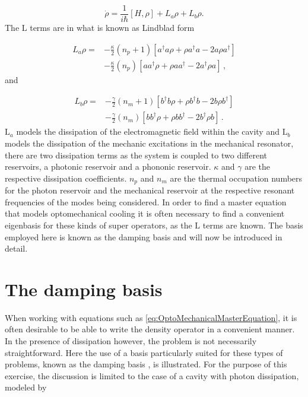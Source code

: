 \documentclass[12pt]{article}
\begin{document}
\begin{equation} \label{eq:OptoMechanicalMasterEquation}
\dot{\rho} = \frac{1}{i\hbar}[H,\rho] +L_a\rho + L_b \rho.
\end{equation} The $\mathrm{L}$ terms are in what is known as Lindblad form 

\begin{align}
L_a \rho =& - \frac{\kappa}{2}(n_p + 1)[a^\dagger a\rho + \rho a^\dagger a -2a\rho a^\dagger]  \\
 &- \frac{\kappa}{2}(n_p)[ aa^\dagger\rho + \rho  aa^\dagger -2a^\dagger\rho a]\, ,\nonumber
\end{align} and

\begin{align}
L_b \rho =& - \frac{\gamma}{2}(n_m + 1)[b^\dagger b\rho + \rho b^\dagger b -2b\rho b^\dagger]  \\
 &- \frac{\gamma}{2}(n_m)[ bb^\dagger\rho + \rho  bb^\dagger -2b^\dagger\rho b]\, .\nonumber
\end{align} $\mathrm{L}_a$ models the dissipation of the electromagnetic field within the cavity and $\mathrm{L}_b$ models the dissipation of the mechanic excitations in the mechanical resonator, there are two dissipation terms as the system is coupled to two different reservoirs, a photonic reservoir and a phononic reservoir. $\kappa$ and $\gamma$ are the respective dissipation coefficients. $n_p$ and $n_m$ are the thermal occupation numbers for the photon reservoir and the mechanical reservoir at the respective resonant frequencies of the modes being considered. In order to find a master equation that models optomechanical cooling it is often necessary to find a convenient eigenbasis for these kinds of super operators, as the $\mathrm{L}$ terms are known. The basis employed here is known as the damping basis and will now be introduced in detail. 

\section{The damping basis}

When working with equations such as \ref{eq:OptoMechanicalMasterEquation}, it is often desirable to be able to write the density operator in a convenient manner.  In the presence of dissipation however, the problem is not necessarily straightforward. Here the use of a basis particularly suited for these types of problems, known as the damping basis \cite{BriegelDampingBasis1993}, is illustrated. For the purpose of this exercise, the discussion is limited to the case of a cavity with photon dissipation, modeled by
\end{document}
